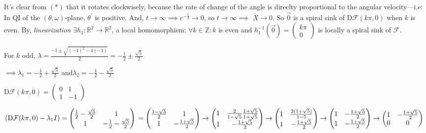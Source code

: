 \documentclass{article}
\begin{document}
It's clear from $(*)$ that it rotates clockwisely, because the
rate of change of the angle is direclty proportional
to the angular velocity---i.e: In QI of the $(\theta,\omega)$-plane,
$\theta^\prime$ is positive. And, $t\rightarrow \infty \implies
e^{-\frac{t}{2}}\rightarrow 0$, so $t\rightarrow \infty \implies $
$\underbar{\overline{X}}\rightarrow 0$.
So $\vec{0}$ is  a spiral sink of $\text{D}\mathcal{F}(k\pi,0)$ when
$k$ is even. By, \textit{linearization}  $\exists
h_1:\mathbb{R}^2\rightarrow \mathbb{R}^2$, a local homomorphism:
$\forall k\in \mathbb{Z}: k$ is even and $ h_1^{-1}(\vec{0}) = \begin{pmatrix}
  k\pi\\0\end{pmatrix}$ is locally a spiral sink of $\mathcal{F}$.

For $k$ odd, $\lambda = \frac{-1 \pm\sqrt{(-1)^2 -4(-1)}}{2} =
-\frac{1}{2} \pm\frac{\sqrt{5}}{2} $

$\implies \lambda_1 = -\frac{1}{2} +\frac{\sqrt{5}}{2}$ and$\lambda_2 =
-\frac{1}{2} -\frac{\sqrt{5}}{2} $

$\text{D}\mathcal{F}(k\pi,0)= \begin{pmatrix} 0 &
    1 \\ 1 & -1\end{pmatrix} $

$(\text{D}\mathcal{F}(k\pi,0) -\lambda_1 I)= \begin{pmatrix} \frac{1}{2} -\frac{\sqrt{5}}{2} &
  1 \\ 1 & -\frac{1}{2} -\frac{\sqrt{5}}{2}\end{pmatrix}\\
=
\begin{pmatrix} \frac{1-\sqrt{5}}{2} &
  1 \\ 1 & -\frac{1+\sqrt{5}}{2}\end{pmatrix}
\rightarrow
\begin{pmatrix} 1 & \frac{2}{1-\sqrt{5}}\frac{1+\sqrt{5}}{1+\sqrt{5}}
 \\ 1 & -\frac{1+\sqrt{5}}{2}\end{pmatrix}
\rightarrow
\begin{pmatrix} 1 & \frac{2(1+\sqrt{5})}{1-5}
 \\ 1 & -\frac{1+\sqrt{5}}{2}\end{pmatrix}
\rightarrow
\begin{pmatrix} 1 & -\frac{1+\sqrt{5}}{2}
  \\ 1 & -\frac{1+\sqrt{5}}{2}\end{pmatrix}
\rightarrow
\begin{pmatrix} 1 & -\frac{1+\sqrt{5}}{2}
 \\ 0 & 0\end{pmatrix}
$
\end{document}
